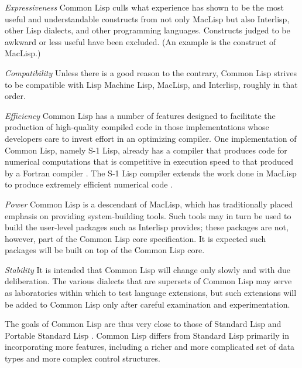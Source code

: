 \begin{flushdesc}
\item[\emph{Expressiveness}]
Common Lisp culls what
experience has shown to be the most useful and understandable constructs
from not only MacLisp but also
Interlisp, other Lisp dialects, and other programming languages.
Constructs judged to be awkward or less useful have been
excluded.   (An example is the  construct of MacLisp.)

\item[\emph{Compatibility}]
Unless there is a good reason to the contrary,
Common Lisp strives to be compatible with Lisp Machine Lisp, MacLisp, and
Interlisp, roughly in that order.

\item[\emph{Efficiency}]
Common Lisp has a number of features designed to
facilitate the production of high-quality compiled code in those
implementations whose developers
care to invest effort in an optimizing compiler.
One implementation of Common Lisp, namely S-1 Lisp, already has a compiler
that produces code for numerical computations that is competitive
in execution speed to that produced by a Fortran compiler \cite{S1-COMPILER}.
The S-1 Lisp compiler
extends the work done in MacLisp to produce extremely efficient
numerical code \cite{MACLISP-BEATS-FORTRAN}.

\item[\emph{Power}]
Common Lisp is a descendant of MacLisp, which has
traditionally placed emphasis on providing system-building tools.
Such tools may in turn be used to build the user-level packages
such as Interlisp provides; these packages are not, however, part
of the Common Lisp core specification.  It is expected such packages will
be built on top of the Common Lisp core.

\item[\emph{Stability}]
It is intended that Common Lisp
will change only slowly and with due deliberation.  The various dialects
that are supersets of Common Lisp may serve as laboratories within which to
test language extensions, but such extensions will be added to
Common Lisp only after careful examination and experimentation.
\end{flushdesc}


The goals of Common Lisp are thus very close to those of Standard Lisp
\cite{STANDARD-LISP-REPORT} and Portable Standard Lisp \cite{PSL-MANUAL}.
Common Lisp differs from Standard Lisp
primarily in incorporating more features, including a
richer and more complicated set of data types and more complex
control structures.

